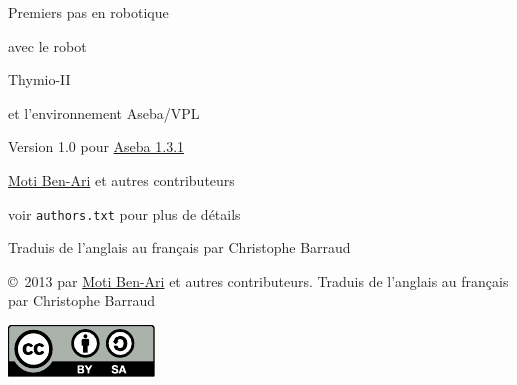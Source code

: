 \thispagestyle{empty}

\begin{center}
\begin{LARGE}
\begin{bfseries}
Premiers pas en robotique

avec le robot

Thymio-II

et l'environnement
\vspace{0.5cm}
Aseba/VPL
\end{bfseries}
\end{LARGE}

\bigskip\bigskip

\begin{Large}
Version 1.0 pour \href{https://aseba.wikidot.com/en:downloadinstall}{Aseba 1.3.1}
\end{Large}

\bigskip\bigskip

\begin{LARGE}
\href{http://www.weizmann.ac.il/sci-tea/benari/}{Moti Ben-Ari} et autres contributeurs\\
\end{LARGE}
\bigskip
\begin{Large}
voir \texttt{authors.txt} pour plus de détails
\end{Large}

\vspace{1cm}

\begin{Large}
Traduis de l'anglais au français par Christophe Barraud
\end{Large}

\bigskip


\end{center}

\vfill

\begin{center}
\copyright{}\  2013 par \href{http://www.weizmann.ac.il/sci-tea/benari/}{Moti Ben-Ari} et autres contributeurs. Traduis de l'anglais au français par Christophe Barraud
\end{center}


\begin{center}
\includegraphics[width=.2\textwidth]{../images/by-sa}
\end{center}

\tableofcontents
\thispagestyle{empty}

